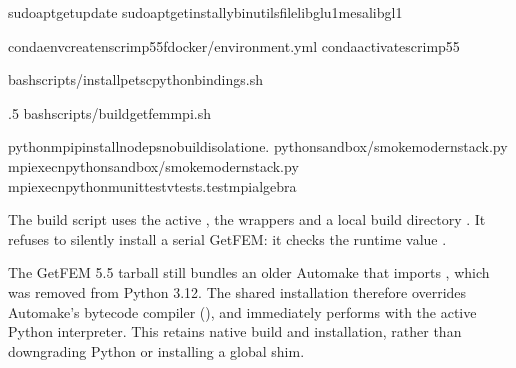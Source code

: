 \documentclass[letterpaper,10pt,english]{sphinxmanual}
\begin{document}
\begin{sphinxVerbatim}[commandchars=\\\{\}]
sudoapt\PYGZhy{}getupdate
sudoapt\PYGZhy{}getinstall\PYGZhy{}ybinutilsfilelibglu1\PYGZhy{}mesalibgl1

condaenvcreate\PYGZhy{}nscrimp55\PYGZhy{}fdocker/environment.yml
condaactivatescrimp55

bashscripts/install\PYGZhy{}petsc\PYGZhy{}python\PYGZhy{}bindings.sh

.5
bashscripts/build\PYGZhy{}getfem\PYGZhy{}mpi.sh

python\PYGZhy{}mpipinstall\PYGZhy{}\PYGZhy{}no\PYGZhy{}deps\PYGZhy{}\PYGZhy{}no\PYGZhy{}build\PYGZhy{}isolation\PYGZhy{}e.
pythonsandbox/smoke\PYGZus{}modern\PYGZus{}stack.py
mpiexec\PYGZhy{}npythonsandbox/smoke\PYGZus{}modern\PYGZus{}stack.py
mpiexec\PYGZhy{}npython\PYGZhy{}munittest\PYGZhy{}vtests.test\PYGZus{}mpi\PYGZus{}algebra
\end{sphinxVerbatim}

\sphinxAtStartPar
The build script uses the active , the
 wrappers and a local build directory
. It refuses to silently install a serial
GetFEM: it checks the runtime value
.

\sphinxAtStartPar
{} The GetFEM 5.5 tarball
still bundles an older Automake  that imports
, which was removed from Python 3.12. The shared
 installation therefore overrides
 Automake’s bytecode compiler
(), and immediately performs
 with the active Python interpreter. This retains
native build and installation, rather than downgrading Python
or installing a global  shim.
\end{document}
